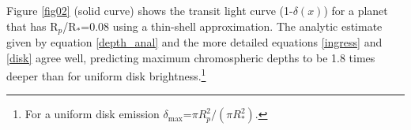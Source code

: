 \documentclass[manuscript]{aastex}
\newcommand{\p}{R$_p$/R$_*$}
\begin{document}

Figure \ref{fig02} (solid curve) shows the transit light curve (1-$\delta (x)$) for a planet that has \p =0.08 using a thin-shell approximation.  The analytic estimate given by equation \ref{depth_anal} and the more detailed equations \ref{ingress} and \ref{disk} agree well, predicting maximum chromospheric depths to be 1.8 times
deeper than for uniform disk brightness.\footnote{For a uniform disk emission $\delta_{\mathrm{max}} $=$\pi R_p^2 /(\pi R_*^2)$.} 


\end{document}
